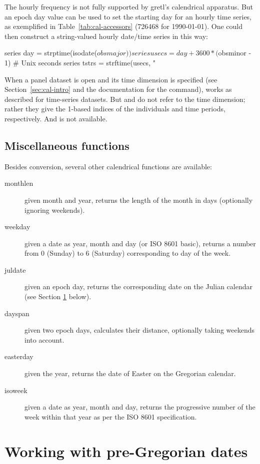 The hourly frequency is not fully supported by gretl's calendrical
apparatus. But an epoch day value can be used to set the starting day
for an hourly time series, as exemplified in
Table~\ref{tab:cal-accessors} (726468 for 1990-01-01). One could then
construct a string-valued hourly date/time series in this way:
%
\begin{code}
series day = strptime(isodate($obsmajor))
series usecs = day + 3600 * ($obsminor - 1) # Unix seconds
series tstrs = strftime(usecs, "%
\end{code}

When a panel dataset is open and its time dimension is specified (see
Section~\ref{sec:cal-intro} and the documentation for the 
command),  works as described for time-series
datasets. But  and  do not refer to
the time dimension; rather they give the 1-based indices of the
individuals and time periods, respectively. And  is
not available.


\subsection{Miscellaneous functions}
\label{sec:cal-misc}

Besides conversion, several other calendrical functions are available:
\begin{description}
\item[monthlen] given month and year, returns the length of the month
  in days (optionally ignoring weekends).
\item[weekday] given a date as year, month and day (or ISO 8601
  basic), returns a number from 0 (Sunday) to 6 (Saturday)
  corresponding to day of the week.
\item[juldate] given an epoch day, returns the corresponding date on
  the Julian calendar (see Section \ref{sec:cal-conversion} below).
\item[dayspan] given two epoch days, calculates their distance,
  optionally taking weekends into account.
\item[easterday] given the year, returns the date of Easter on the
  Gregorian calendar.
\item[isoweek] given a date as year, month and day, returns the
  progressive number of the week within that year as per the ISO 8601
  specification.
\end{description}


\section{Working with pre-Gregorian dates}
\label{sec:cal-conversion}

